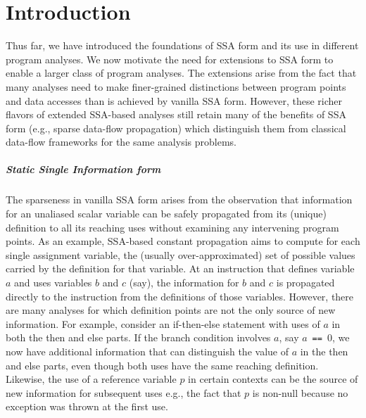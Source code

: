 \chapter{Introduction }


Thus far, we have introduced the foundations of SSA form and its use in different program analyses.  We now motivate the need for extensions to SSA form to enable a larger class of program analyses.  The extensions arise from the fact that many analyses need to make finer-grained distinctions between program points and data accesses than is achieved by vanilla SSA form.  However, these richer flavors of extended SSA-based analyses still retain many of the benefits of SSA form (e.g., sparse data-flow propagation)  which distinguish them from classical data-flow frameworks for the same analysis problems.


\paragraph{Static Single Information form}

The sparseness in vanilla SSA form arises from the observation that information for an unaliased scalar variable can be safely propagated from its (unique) definition to all its reaching uses without examining any intervening program points.  As an example, SSA-based constant propagation aims to compute for each single assignment variable, the (usually over-approximated) set of possible values carried by the definition for that variable. At an instruction that defines variable $a$ and uses variables $b$ and $c$ (say), the information for $b$ and $c$ is propagated directly to the instruction from the definitions of those variables.  However, there are many analyses for which definition points are not the only source of new information. For example, consider an if-then-else statement with uses of $a$ in both the then and else parts.  If the branch condition involves $a$, say $a$~{\tt ==}~0, we now have additional information that can distinguish the value of $a$ in the then and else parts, even though both uses have the same reaching definition.  Likewise, the use of a reference  variable $p$ in certain contexts can be the source of new information for subsequent uses e.g., the fact that $p$ is non-null because no exception was thrown at the first use.

